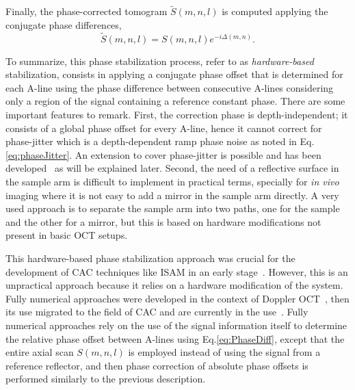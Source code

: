 Finally, the phase-corrected tomogram $\tilde{S}(m,n,l)$ is computed applying the conjugate phase differences,
\begin{equation}
	\tilde{S}(m,n,l) = S(m,n,l)e^{-i\Delta(m,n)}.
\end{equation}

To summarize, this phase stabilization process, refer to as \textit{hardware-based} stabilization, consists in applying a conjugate phase offset that is determined for each A-line using the phase difference between consecutive A-lines considering only a region of the signal containing a reference constant phase. There are some important features to remark. First, the correction phase is depth-independent; it consists of a global phase offset for every A-line, hence it cannot correct for phase-jitter which is a depth-dependent ramp phase noise as noted in Eq.\eqref{eq:phaseJitter}. An extension to cover phase-jitter is possible and has been developed~\cite{Vakoc2005_Phaseresolved} as will be explained later. Second, the need of a reflective surface in the sample arm is difficult to implement in practical terms, specially for \textit{in vivo} imaging where it is not easy to add a mirror in the sample arm directly. A very used approach is to separate the sample arm into two paths, one for the sample and the other for a mirror, but this is based on hardware modifications not present in basic OCT setups. 

This hardware-based phase stabilization approach was crucial for the development of CAC techniques like ISAM in an early stage~\cite{Ralston2006_Phase}. However, this is an unpractical approach because it relies on a hardware modification of the system. Fully numerical approaches were developed in the context of Doppler OCT~\cite{White2003_vivo}, then its use migrated to the field of CAC and are currently in the use~\cite{Shemonski2014_Threedimensional}. Fully numerical approaches rely on the use of the signal information itself to determine the relative phase offset between A-lines using Eq.\eqref{eq:PhaseDiff}, except that the entire axial scan $S(m,n,l)$ is employed instead of using the signal from a reference reflector, and then phase correction of absolute phase offsets is performed similarly to the previous description.

